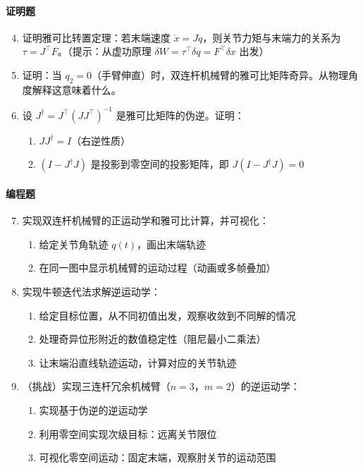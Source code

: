 \paragraph{证明题}
\begin{enumerate}
    \setcounter{enumi}{3}
    \item 证明雅可比转置定理：若末端速度 $\dot{x} = J\dot{q}$，则关节力矩与末端力的关系为 $\tau = J^\top F$。（提示：从虚功原理 $\delta W = \tau^\top \delta q = F^\top \delta x$ 出发）
    
    \item 证明：当 $q_2 = 0$（手臂伸直）时，双连杆机械臂的雅可比矩阵奇异。从物理角度解释这意味着什么。
    
    \item 设 $J^\dagger = J^\top(JJ^\top)^{-1}$ 是雅可比矩阵的伪逆。证明：
    \begin{enumerate}
        \item $JJ^\dagger = I$（右逆性质）
        \item $(I - J^\dagger J)$ 是投影到零空间的投影矩阵，即 $J(I - J^\dagger J) = 0$
    \end{enumerate}
\end{enumerate}

\paragraph{编程题}
\begin{enumerate}
    \setcounter{enumi}{6}
    \item 实现双连杆机械臂的正运动学和雅可比计算，并可视化：
    \begin{enumerate}
        \item 给定关节角轨迹 $q(t)$，画出末端轨迹
        \item 在同一图中显示机械臂的运动过程（动画或多帧叠加）
    \end{enumerate}
    
    \item 实现牛顿迭代法求解逆运动学：
    \begin{enumerate}
        \item 给定目标位置，从不同初值出发，观察收敛到不同解的情况
        \item 处理奇异位形附近的数值稳定性（阻尼最小二乘法）
        \item 让末端沿直线轨迹运动，计算对应的关节轨迹
    \end{enumerate}
    
    \item （挑战）实现三连杆冗余机械臂（$n=3$，$m=2$）的逆运动学：
    \begin{enumerate}
        \item 实现基于伪逆的逆运动学
        \item 利用零空间实现次级目标：远离关节限位
        \item 可视化零空间运动：固定末端，观察肘关节的运动范围
    \end{enumerate}
\end{enumerate}

